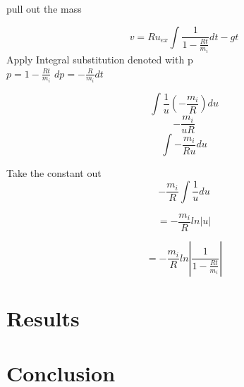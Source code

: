 \documentclass{article}
\begin{document}
pull out the mass

\begin{equation}
v = Ru_{ex}\int{\frac{1}{1-\frac{Rt}{m_i}}}dt - gt
\end{equation}
Apply Integral substitution denoted with p \\
$p = 1-\frac{Rt}{m_i}$
$dp = - \frac{R}{m_i}dt$

\begin{equation}
\int{\frac{1}{u}(-\frac{m_i}{R})du}
\end{equation}
\begin{equation}
- \frac{m_i}{uR}
\end{equation}
\begin{equation}
\int{-\frac{m_i}{Ru} du}
\end{equation}

Take the constant out
\begin{equation}
-\frac{m_i}{R} \int{\frac{1}{u}du}
\end{equation}

\begin{equation}
= -\frac{m_i}{R}ln|u|
\end{equation}

\begin{equation}
= -\frac{m_i}{R}ln|\frac{1}{1-\frac{Rt}{m_i}}|
\end{equation}

\section{Results}

\section{Conclusion}
\end{document}
